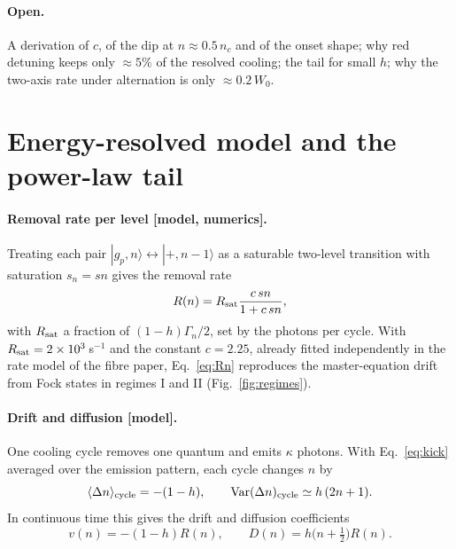 \documentclass[11pt,a4paper]{article}
\newcommand{\ket}[1]{|#1\rangle}
\begin{document}
\paragraph{Open.} A derivation of $c$, of the dip at $n\approx0.5\,n_c$ and of the onset shape; why red detuning keeps only $\approx5\%$ of the resolved cooling; the tail for small $h$; why the two-axis rate under alternation is only $\approx0.2\,W_0$.

\section{Energy-resolved model and the power-law tail}
\label{sec:model}
\paragraph{Removal rate per level [model, numerics].} Treating each pair $\ket{g_p,n}\leftrightarrow\ket{+,n-1}$ as a saturable two-level transition with saturation $s_n=sn$ gives the removal rate
\begin{equation}
  R(n)=R_{\rm sat}\frac{c\,sn}{1+c\,sn},
  \label{eq:Rn}
\end{equation}
with $R_{\rm sat}$ a fraction of $(1-h)\Gamma_n/2$, set by the photons per cycle. With $R_{\rm sat}=2\times10^3$\,s$^{-1}$ and the constant $c=2.25$, already fitted independently in the rate model of the fibre paper, Eq.~\eqref{eq:Rn} reproduces the master-equation drift from Fock states in regimes I and II (Fig.~\ref{fig:regimes}).

\paragraph{Drift and diffusion [model].} One cooling cycle removes one quantum and emits $\kappa$ photons. With Eq.~\eqref{eq:kick} averaged over the emission pattern, each cycle changes $n$ by
\begin{equation}
  \langle\Delta n\rangle_{\rm cycle}=-(1-h),\qquad {\rm Var}(\Delta n)_{\rm cycle}\simeq h\,(2n+1).
\end{equation}
In continuous time this gives the drift and diffusion coefficients
\begin{equation}
  v(n)=-(1-h)R(n),\qquad D(n)=h\big(n+\tfrac12\big)R(n).
\end{equation}
\end{document}
